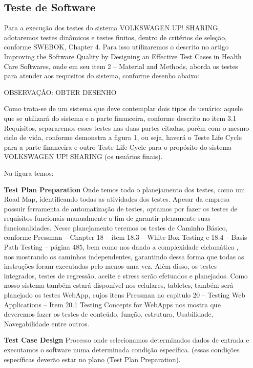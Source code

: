 \documentclass[12pt]{article}
\begin{document}
\subsection{Teste de Software}

Para a execução dos testes  do sistema VOLKSWAGEN UP! SHARING, adotaremos testes dinâmicos  e testes finitos, dentro de critérios de seleção, conforme SWEBOK, Chapter 4. Para isso utilizaremos o descrito no artigo Improving the Software Quality by Designing an Effective Test Cases in Health Care Softwares, onde em seu item 2 – Material and Methods, aborda os testes para atender aos requisitos do sistema, conforme desenho abaixo:

OBSERVAÇÂO: OBTER DESENHO

Como trata-se de um sistema que deve contemplar dois tipos de usuário: aquele que se utilizará do sistema e a parte financeira, conforme descrito no item 3.1 Requisitos, separaremos esses testes nas duas partes citadas, porém com o mesmo ciclo de vida, conforme   demonstra a figura 1, ou seja, haverá o Teste Life Cycle para a parte financeira e outro Teste Life Cycle para o propósito do sistema VOLKSWAGEN UP! SHARING (os usuários finais).

Na figura temos:

\textbf{Test Plan Preparation}
Onde temos todo o planejamento dos testes, como um Road Map, identificando todas as atividades dos testes.  Apesar da empresa possuir ferramenta de automatização de testes, optamos por fazer os testes de requisitos funcionais manualmente a fim de garantir plenamente suas funcionalidades.
Nesse planejamento teremos os testes de Caminho Básico, conforme Pressman – Chapter 18 – item 18.3 – White Box Testing  e 18.4 – Basis Path Testing – página 485, bem como nos dando a complexidade ciclomática , nos mostrando os caminhos independentes, garantindo dessa forma que todas as instruções foram executadas pelo menos uma vez. 
Além disso, os testes integrados, testes de regressão, aceite e stress serão efetuados e planejados.
Como nosso sistema também estará disponível nos celulares, tabletes, também será planejado os testes WebApp, cujos itens Pressman no capitulo 20 – Testing Web Applications – Item 20.1 Testing Concepts for WebApps nos mostra que deveremos fazer os testes de conteúdo, função, estrutura, Usabilidade, Navegabilidade entre outros.

\textbf{Test Case Design}
Processo onde selecionamos determinados dados de entrada e executamos o software numa determinada condição específica. (essas condições específicas deverão estar no plano (Test Plan Preparation).
\end{document}
